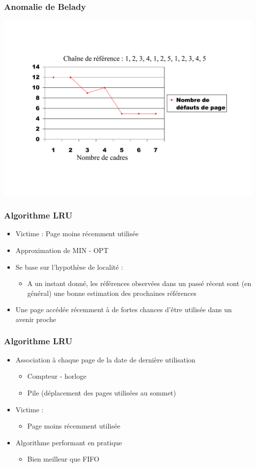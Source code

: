 \begin{frame}
\frametitle{Anomalie de Belady}
\includegraphics[width=\textwidth]{../illustration/remplacement_fifo_belady.pdf}
\end{frame}


\begin{frame}
\frametitle{Algorithme LRU}
\begin{itemize}
\item Victime : Page moins récemment utilisée
\item Approximation de MIN - OPT
\item Se base sur l'hypothèse de localité :
\begin{itemize}
\item A un instant donné, les références observées dans un passé récent sont (en général) une bonne estimation des prochaines références
\end{itemize}
\item Une page accédée récemment à de fortes chances d'être utilisée dans un avenir proche
\end{itemize}
\end{frame}


\begin{frame}
\frametitle{Algorithme LRU}
\begin{itemize}
\item Association à chaque page de la date de dernière utilisation
\begin{itemize}
\item Compteur - horloge
\item Pile (déplacement des pages utilisées au sommet)
\end{itemize}
\item Victime :
\begin{itemize}
\item Page moins récemment utilisée
\end{itemize}
\item Algorithme performant en pratique
\begin{itemize}
\item Bien meilleur que FIFO
\end{itemize}
\end{itemize}
\end{frame}


